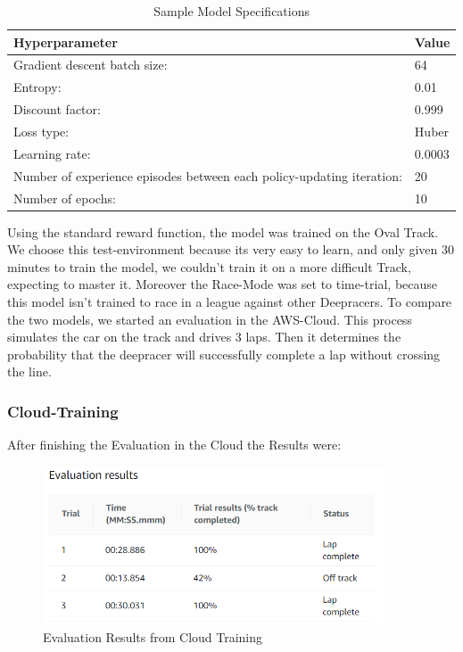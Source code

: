 \begin{table} [H]
\caption{Sample Model Specifications}
\label{Sample Model Specifications}
\centering
\begin{tabular}{|m{15em}|m{1cm}|}
\hline
\textbf{Hyperparameter} & \textbf{Value} \\
\hline
Gradient descent batch size: & 64 \\
\hline
Entropy: & 0.01 \\
\hline
Discount factor: & 0.999 \\
\hline
Loss type: & Huber \\
\hline
Learning rate: & 0.0003 \\
\hline
Number of experience episodes between each policy-updating iteration: & 20 \\
\hline
Number of epochs: & 10 \\
\hline
\end{tabular}
\end{table}

Using the standard reward function, the model was trained on the Oval Track. We choose this test-environment because its very easy to learn, and only given 30 minutes to train the model, we couldn't train it on a more difficult Track, expecting to master it. Moreover the Race-Mode was set to time-trial, because this model isn't trained to race in a league against other Deepracers.
\newline
To compare the two models, we started an evaluation in the AWS-Cloud. This process simulates the car on the track and drives 3 laps. Then it determines the probability that the deepracer will successfully complete a lap without crossing the line.


\subsubsection{Cloud-Training}
After finishing the Evaluation in the Cloud the Results were:

\begin{figure}[H]
    \centering
    \includegraphics[width=0.9\textwidth]{images/CloudEvaluationResults.PNG}
    \caption[]{Evaluation Results from Cloud Training}
    \label{fig:evRe}
\end{figure}



